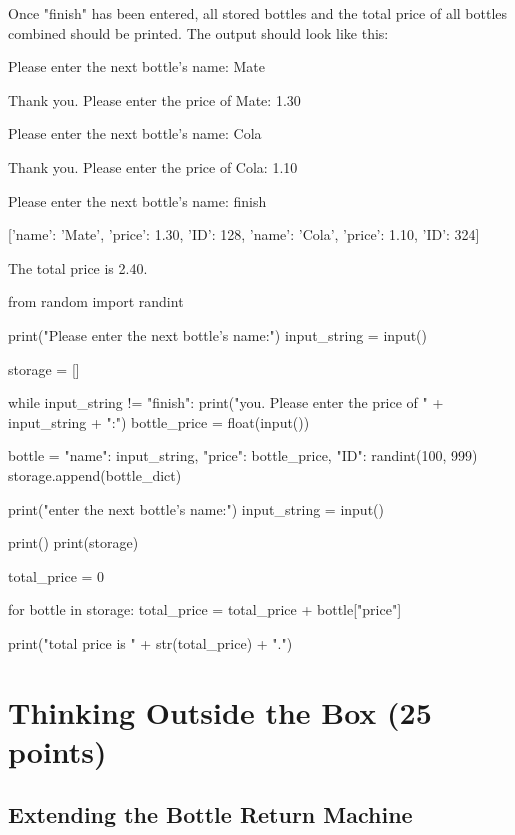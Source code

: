\noindent Once "finish" has been entered, all stored bottles and the total price of all bottles combined should be printed. The output should look like this:

\begin{outputcode}
Please enter the next bottle's name:
Mate

Thank you. Please enter the price of Mate:
1.30

Please enter the next bottle's name:
Cola

Thank you. Please enter the price of Cola:
1.10

Please enter the next bottle's name:
finish

[{'name': 'Mate', 'price': 1.30, 'ID': 128}, {'name': 'Cola', 'price': 1.10, 'ID': 324}]

The total price is 2.40.

\end{outputcode}

\begin{solution}
	\begin{pythoncode}
from random import randint

print("Please enter the next bottle's name:")
input_string = input()

storage = []

while input_string != "finish":
	print("\nThank you. Please enter the price of " + input_string + ":")
	bottle_price = float(input())

	bottle = {"name": input_string, "price": bottle_price, "ID": randint(100, 999)}
	storage.append(bottle_dict)

	print("\nPlease enter the next bottle's name:")
	input_string = input()

print()
print(storage)

total_price = 0

for bottle in storage:
	total_price = total_price + bottle["price"]

print("\nThe total price is " + str(total_price) + ".")
	\end{pythoncode}
\end{solution}

\section{Thinking Outside the Box (25 points)}

\subsection{Extending the Bottle Return Machine}

